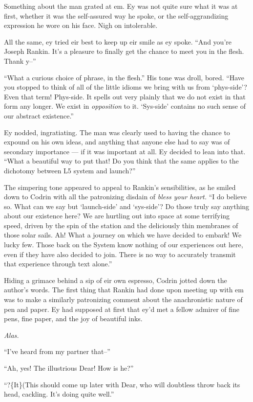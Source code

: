Something about the man grated at em. Ey was not quite sure what it was at first, whether it was the self-assured way he spoke, or the self-aggrandizing expression he wore on his face. Nigh on intolerable.

All the same, ey tried eir best to keep up eir smile as ey spoke. ``And you're Joseph Rankin. It's a pleasure to finally get the chance to meet you in the flesh. Thank y--''

``What a curious choice of phrase, in the flesh.'' His tone was droll, bored. ``Have you stopped to think of all of the little idioms we bring with us from `phys-side'? Even that term! Phys-side. It spells out very plainly that we do not exist in that form any longer. We exist in \emph{opposition} to it. `Sys-side' contains no such sense of our abstract existence.''

Ey nodded, ingratiating. The man was clearly used to having the chance to expound on his own ideas, and anything that anyone else had to say was of secondary importance — if it was important at all. Ey decided to lean into that. ``What a beautiful way to put that! Do you think that the same applies to the dichotomy between L5 system and launch?''

The simpering tone appeared to appeal to Rankin's sensibilities, as he smiled down to Codrin with all the patronizing disdain of \emph{bless your heart.} ``I do believe so. What can we say but `launch-side' and `sys-side'? Do those truly say anything about our existence here? We are hurtling out into space at some terrifying speed, driven by the spin of the station and the deliciously thin membranes of those solar sails. Ah! What a journey on which we have decided to embark! We lucky few. Those back on the System know nothing of our experiences out here, even if they have also decided to join. There is no way to accurately transmit that experience through text alone.''

Hiding a grimace behind a sip of eir own espresso, Codrin jotted down the author's words. The first thing that Rankin had done upon meeting up with em was to make a similarly patronizing comment about the anachronistic nature of pen and paper. Ey had supposed at first that ey'd met a fellow admirer of fine pens, fine paper, and the joy of beautiful inks.

\emph{Alas.}

``I've heard from my partner that--''

``Ah, yes! The illustrious Dear! How is he?''

``?\{It\}(This should come up later with Dear, who will doubtless throw back its head, cackling. It's doing quite well.''

